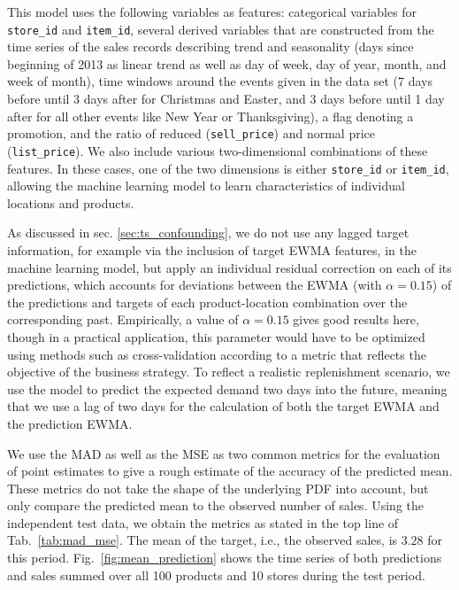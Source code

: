 \documentclass[BCOR=1mm, DIV=calc,10pt,
twoside=true,
twocolumn,
headings=normal]{scrartcl}
\newcommand{\fig}{Fig.~}
\newcommand{\tab}{Tab.~}
\begin{document}
This model uses the following variables as features: categorical variables for \texttt{store\_id} and \texttt{item\_id}, several derived variables that are constructed from the time series of the sales records describing trend and seasonality (days since beginning of 2013 as linear trend as well as day of week, day of year, month, and week of month), time windows around the events given in the data set (7 days before until 3 days after for Christmas and Easter, and 3 days before until 1 day after for all other events like New Year or Thanksgiving), a flag denoting a promotion, and the ratio of reduced (\texttt{sell\_price}) and normal price (\texttt{list\_price}). We also include various two-dimensional combinations of these features. In these cases, one of the two dimensions is either \texttt{store\_id} or \texttt{item\_id}, allowing the machine learning model to learn characteristics of individual locations and products.

\noindent
As discussed in sec. \ref{sec:ts_confounding}, we do not use any lagged target information, for example via the inclusion of target EWMA features, in the machine learning model, but apply an individual residual correction on each of its predictions, which accounts for deviations between the EWMA (with $\alpha=0.15$) of the predictions and targets of each product-location combination over the corresponding past. Empirically, a value of $\alpha=0.15$ gives good results here, though in a practical application, this parameter would have to be optimized using methods such as cross-validation according to a metric that reflects the objective of the business strategy. To reflect a realistic replenishment scenario, we use the model to predict the expected demand two days into the future, meaning that we use a lag of two days for the calculation of both the target EWMA and the prediction EWMA.

We use the MAD as well as the MSE as two common metrics for the evaluation of point estimates to give a rough estimate of the accuracy of the predicted mean. These metrics do not take the shape of the underlying PDF into account, but only compare the predicted mean to the observed number of sales. Using the independent test data, we obtain the metrics as stated in the top line of \tab \ref{tab:mad_mse}. The mean of the target, i.e., the observed sales, is $3.28$ for this period. \fig \ref{fig:mean_prediction} shows the time series of both predictions and sales summed over all 100 products and 10 stores during the test period.
\end{document}
